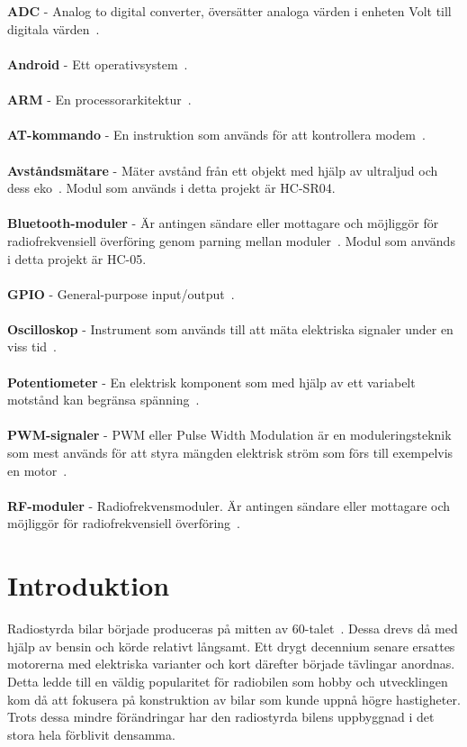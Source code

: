 \documentclass[a4paper]{article}
\begin{document}
\newpage
{}
\\\\
{\bf ADC} - Analog to digital converter, översätter analoga värden i enheten Volt till digitala värden~\cite{ADC}.
\\\\
{\bf Android} - Ett operativsystem~\cite{Android}.
\\\\
{\bf ARM} - En processorarkitektur~\cite{chalmersARM}.
\\\\
{\bf AT-kommando} - En instruktion som används för att kontrollera modem~\cite{AT}.
\\\\
{\bf Avståndsmätare} - Mäter avstånd från ett objekt med hjälp av ultraljud och dess eko~\cite{DistMeasure}. Modul som används i detta projekt är HC-SR04.
\\\\
{\bf Bluetooth-moduler} - Är antingen sändare eller mottagare och möjliggör för radiofrekvensiell överföring genom parning mellan moduler~\cite{Bluetooth}. Modul som används i detta projekt är HC-05.
\\\\
{\bf GPIO} - General-purpose input/output~\cite{chalmersARM}.
\\\\
{\bf Oscilloskop} - Instrument som används till att mäta elektriska signaler under en viss tid~\cite{oscilloscope}.
\\\\
{\bf Potentiometer} - En elektrisk komponent som med hjälp av ett variabelt motstånd kan begränsa spänning~\cite{Potentiometer}.
\\\\
{\bf PWM-signaler} - PWM eller Pulse Width Modulation är en moduleringsteknik som mest används för att styra mängden elektrisk ström som förs till exempelvis en motor~\cite{PWM}.
\\\\
{\bf RF-moduler} - Radiofrekvensmoduler. Är antingen sändare eller mottagare och möjliggör för radiofrekvensiell överföring~\cite{RFModule}.


\newpage
\section{Introduktion}
Radiostyrda bilar började produceras på mitten av 60-talet~\cite{RCHistory}. Dessa drevs då med hjälp av bensin och körde relativt långsamt. Ett drygt decennium senare ersattes motorerna med elektriska varianter och kort därefter började tävlingar anordnas. Detta ledde till en väldig popularitet för radiobilen som hobby och utvecklingen kom då att fokusera på konstruktion av bilar som kunde uppnå högre hastigheter. Trots dessa mindre förändringar har den radiostyrda bilens uppbyggnad i det stora hela förblivit densamma.
\end{document}
